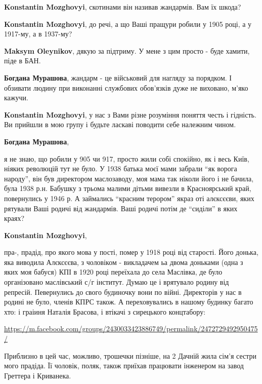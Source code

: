 \begin{itemize}
\begin{itemize}
\begin{itemize}
\textbf{Konstantin Mozghovyi}, скотинами він називав жандармів. Вам їх шкода?

\textbf{Konstantin Mozghovyi}, до речі, а що Ваші пращури робили у 1905 році, а у 1917-му, а в 1937-му?

\textbf{Maksym Oleynikov}, дякую за підтриму. У мене з цим просто - буде хамити, піде в БАН.

\textbf{Богдана Мурашова}, жандарм - це військовий для нагляду за порядком. І обзивати людину при виконанні службових обов'язків дуже не виховано, м'яко кажучи.

\textbf{Konstantin Mozghovyi}, у нас з Вами різне розуміння поняття честь і гідність. Ви прийшли в мою групу і будьте ласкаві поводити себе належним чином.

\textbf{Богдана Мурашова}, 

я не знаю, що робили у 905 чи 917, просто жили собі спокійно, як і весь Київ,
ніяких революцій тут не було. У 1938 батька моєї мами забрали \enquote{як ворога
народу}, він був директором маслозаводу, моя мама так ніколи його і не бачила,
була 1938 р.н. Бабушку з трьома малими дітьми вивезли в Красноярський край,
повернулись у 1946 р. А займались \enquote{красним терором} якраз оті алєксєєви, яких
рятували Ваші родичі від жандармів. Ваші родичі потім де \enquote{сиділи} в яких
краях?

\textbf{Konstantin Mozghovyi}, 

пра-, прадід, про якого мова у пості, помер у 1918 році від старості. Його
донька, яка виводила Алєксєєва, з чоловіком - викладачем ьа двома доньками
(одна з яких моя бабуся) КПІ в 1920 році переїхала до села Маслівка, де було
організовано маслівський с/г інститут. Думаю це і врятувало родину від
репресій. Певернулись до свого будиночку вони по війні. Директорів у нас в
родині не було, членів КПРС також. А переховувались в нашому будинку багато
хто: і граіиня Наталія Брасова, і втікачі з сирецького концтабору:

\url{https://m.facebook.com/groups/2430033423886749/permalink/2472729492950475/}

\end{itemize} %

\end{itemize} %


Приблизно в цей час, можливо, трошечки пізніше, на 2 Дачній жила сім'я сестри
мого прадіда. Її чоловік, поляк, також приїхав працювати інженером на завод
Греттера і Криванека.


\end{itemize}
